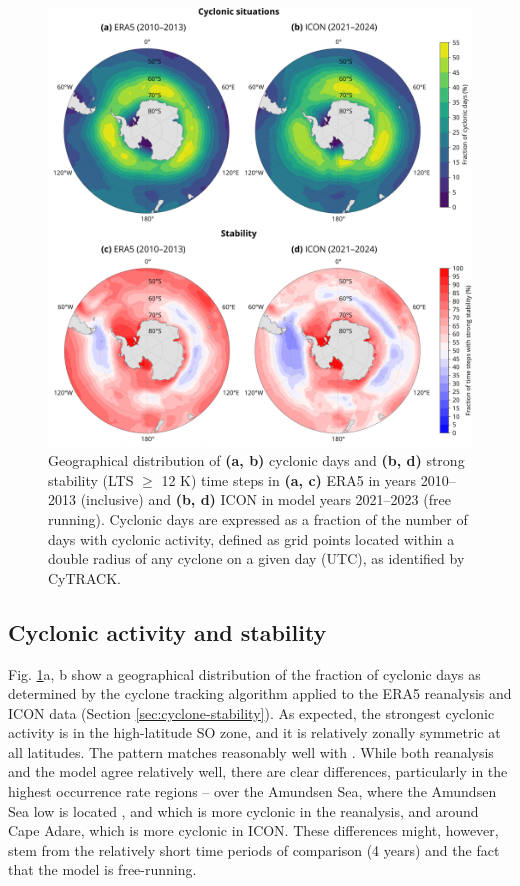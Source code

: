 \documentclass[draft]{agujournal2019}
\begin{document}
\begin{figure}[p!]
\centering
\includegraphics[width=\textwidth]{img/cyc_stab_dist.pdf}
\caption{
Geographical distribution of \textbf{(a, b)} cyclonic days and \textbf{(b, d)} strong stability (LTS $\geq$ 12 K) time steps in \textbf{(a, c)} ERA5 in years 2010--2013 (inclusive) and \textbf{(b, d)} ICON in model years 2021--2023 (free running). Cyclonic days are expressed as a fraction of the number of days with cyclonic activity, defined as grid points located within a double radius of any cyclone on a given day (UTC), as identified by CyTRACK.
}
\label{fig:cyclone-stability}
\end{figure}

\subsection{Cyclonic activity and stability}

Fig. \ref{fig:cyclone-stability}a, b show a geographical distribution of the fraction of cyclonic days as determined by the cyclone tracking algorithm applied to the ERA5 reanalysis and ICON data (Section \ref{sec:cyclone-stability}). As expected, the strongest cyclonic activity is in the high-latitude SO zone, and it is relatively zonally symmetric at all latitudes. The pattern matches reasonably well with . While both reanalysis and the model agree relatively well, there are clear differences, particularly in the highest occurrence rate regions -- over the Amundsen Sea, where the Amundsen Sea low is located , and which is more cyclonic in the reanalysis, and around Cape Adare, which is more cyclonic in ICON. These differences might, however, stem from the relatively short time periods of comparison (4 years) and the fact that the model is free-running.
\end{document}
